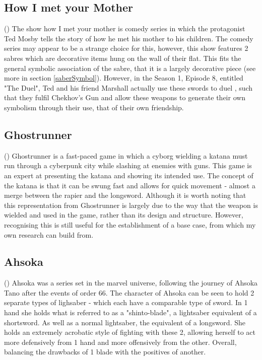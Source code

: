 \documentclass{article}
\begin{document}
\subsection{How I met your Mother}

()
The show how I met your mother is comedy series in which the protagonist Ted Mosby tells the story of how he met his mother to his children. The comedy series may appear to be a strange choice for this, however, this show features 2 sabres which are decorative items hung on the wall of their flat. This fits the general symbolic association of the sabre, that it is a largely decorative piece (see more in section \ref{saberSymbol}). However, in the Season 1, Episode 8, entitled "The Duel", Ted and his friend Marshall actually use these swords to duel \parencite{theduel}, such that they fulfil Chekhov's Gun \parencite{delaney1990chekhov} and allow these weapons to generate their own symbolism through their use, that of their own friendship.

\subsection{Ghostrunner}

()
Ghostrunner is a fast-paced game in which a cyborg wielding a katana must run through a cyberpunk city while slashing at enemies with guns. This game is an expert at presenting the katana and showing its intended use. The concept of the katana is that it can be swung fast and allows for quick movement - almost a merge between the rapier and the longsword. Although it is worth noting that this representation from Ghostrunner is largely due to the way that the weapon is wielded and used in the game, rather than its design and structure. However, recognising this is still useful for the establishment of a base case, from which my own research can build from.

\subsection{Ahsoka}

()
Ahsoka was a series set in the marvel universe, following the journey of Ahsoka Tano after the events of order 66. The character of Ahsoka can be seen to hold 2 separate types of lighsaber - which each have a comparable type of sword. In 1 hand she holds what is referred to as a "shinto-blade", a lightsaber equivalent of a shortsword. As well as a normal lightsaber, the equivalent of a longsword. She holds an extremely acrobatic style of fighting with these 2, allowing herself to act more defensively from 1 hand and more offensively from the other. Overall, balancing the drawbacks of 1 blade with the positives of another. 
\end{document}
